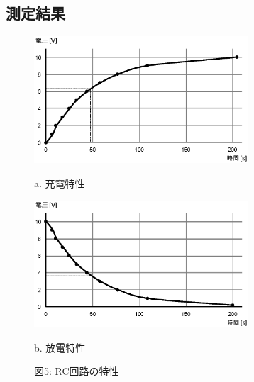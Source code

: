 \documentclass[uplatex]{jsarticle}
\begin{document}
		\subsection{測定結果}
			\begin{figure}[h]
				\begin{minipage}{0.5\hsize}
					\begin{center}
						\includegraphics[width = 8cm]{5-a.eps}
					\end{center}
					\captionsetup{labelformat=empty,labelsep=none}
					\caption{a. 充電特性}
				\end{minipage}
				\begin{minipage}{0.5\hsize}
					\begin{center}
						\includegraphics[width = 8cm]{5-b.eps}
					\end{center}
					\captionsetup{labelformat=empty,labelsep=none}
					\caption{b. 放電特性}
				\end{minipage}
				\captionsetup{labelformat=empty,labelsep=none}
				\caption{図5: RC回路の特性}
			\end{figure}
\end{document}
